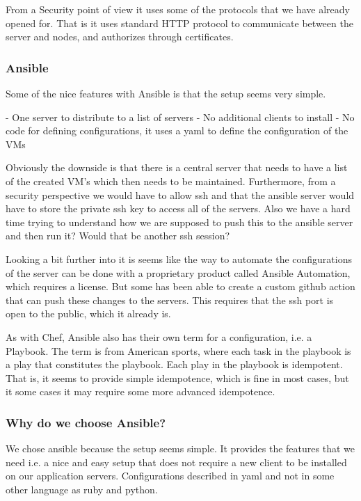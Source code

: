 From a Security point of view it uses some of the protocols that we have already opened for. That is it uses standard HTTP protocol to communicate between the server and nodes, and authorizes through certificates.

\subsubsection{Ansible}

Some of the nice features with Ansible is that the setup seems very simple.

- One server to distribute to a list of servers
- No additional clients to install
- No code for defining configurations, it uses a yaml to define the configuration of the VMs

Obviously the downside is that there is a central server that needs to have a list of the created VM’s which then needs to be maintained. Furthermore, from a security perspective we would have to allow ssh and that the ansible server would have to store the private ssh key to access all of the servers. Also we have a hard time trying to understand how we are supposed to push this to the ansible server and then run it? Would that be another ssh session?

Looking a bit further into it is seems like the way to automate the configurations of the server can be done with a proprietary product called Ansible Automation, which requires a license. But some has been able to create a custom github action that can push these changes to the servers. This requires that the ssh port is open to the public, which it already is.

As with Chef, Ansible also has their own term for a configuration, i.e. a Playbook. The term is from American sports, where each task in the playbook is a play that constitutes the playbook. Each play in the playbook is idempotent. That is, it seems to provide simple idempotence, which is fine in most cases, but it some cases it may require some more advanced idempotence.

\subsubsection{Why do we choose Ansible?}

We chose ansible because the setup seems simple. It provides the features that we need i.e. a nice and easy setup that does not require a new client to be installed on our application servers. Configurations described in yaml and not in some other language as ruby and python.

